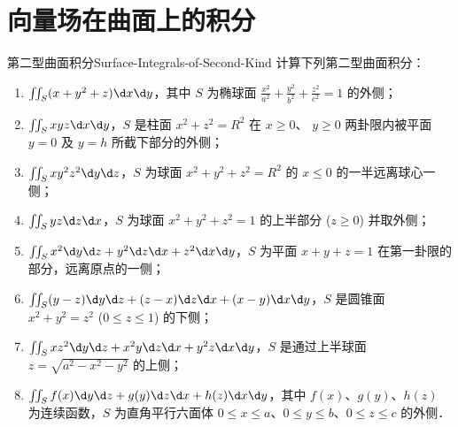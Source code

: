 \section{向量场在曲面上的积分}

\begin{problem}{第二型曲面积分}{Surface-Integrals-of-Second-Kind}
    计算下列第二型曲面积分：
    \begin{enumerate}
        \item $\iint_{S} (x + y^2 + z) \d x \d y$，其中 $S$ 为椭球面 $\frac{x^2}{a^2} + \frac{y^2}{b^2} + \frac{z^2}{c^2} = 1$ 的外侧；
        \item $\iint_{S} x y z \d x \d y$，$S$ 是柱面 $x^2 + z^2 = R^2$ 在 $x \ge 0$、 $y \ge 0$ 两卦限内被平面 $y = 0$ 及 $y = h$ 所截下部分的外侧；
        \item $\iint_{S} x y^2 z^2 \d y \d z$，$S$ 为球面 $x^2 + y^2 + z^2 = R^2$ 的 $x \le 0$ 的一半远离球心一侧；
        \item $\iint_{S} y z \d z \d x$，$S$ 为球面 $x^2 + y^2 + z^2 = 1$ 的上半部分 ($z \ge 0$) 并取外侧；
        \item $\iint_{S} x^2 \d y \d z + y^2 \d z \d x + z^2 \d x \d y$，$S$ 为平面 $x + y + z = 1$ 在第一卦限的部分，远离原点的一侧；
        \item $\iint_{S} (y - z) \d y \d z + (z - x) \d z \d x + (x - y) \d x \d y$，$S$ 是圆锥面 $x^2 + y^2 = z^2$ ($0 \le z \le 1$) 的下侧；
        \item $\iint_{S} x z^2 \d y \d z + x^2 y \d z \d x + y^2 z \d x \d y$，$S$ 是通过上半球面 $z = \sqrt{a^2 - x^2 - y^2}$ 的上侧；
        \item $\iint_{S} f(x) \d y \d z + g(y) \d z \d x + h(z) \d x \d y$，其中 $f(x)$、$g(y)$、$h(z)$ 为连续函数，$S$ 为直角平行六面体 $0 \le x \le a$、$0 \le y \le b$、$0 \le z \le c$ 的外侧．
    \end{enumerate}
\end{problem}

